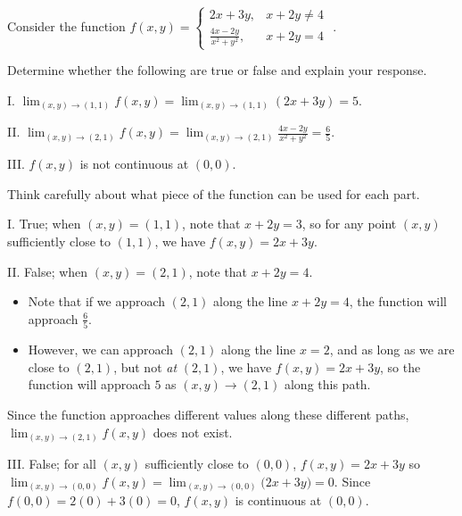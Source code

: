 \documentclass[noauthor, handout]{ximera}
\newcommand{\Lim}[2]{\lim_{#1 \to #2}}
\begin{document}

\begin{problem}
Consider the function $f(x,y) =  \begin{cases} 2x+3y , & x+2y \neq 4 \\[2 ex] \frac{4x-2y}{x^2+y^2} , & x+2y=4 \end{cases} $ . 

Determine whether the following are true or false and explain your response.

I. $\Lim{(x,y)}{(1,1)}f(x,y) = \Lim{(x,y)}{(1,1)} (2x+3y) = 5$.

II. $\Lim{(x,y)}{(2,1)}f(x,y) = \Lim{(x,y)}{(2,1)}  \frac{4x-2y}{x^2+y^2} = \frac{6}{5}$.

III. $f(x,y)$ is not continuous at $(0,0)$.

\begin{freeResponse}
Think carefully about what piece of the function can be used for each part.

I. True; when $(x,y)=(1,1)$, note that $x+2y=3$, so for any point $(x,y)$ sufficiently close to $(1,1)$, we have $f(x,y) = 2x+3y$.

II. False; when $(x,y)=(2,1)$, note that $x+2y=4$.  

\begin{itemize}
\item Note that if we approach $(2,1)$ along the line $x+2y=4$, the function will approach $\frac{6}{5}$.
\item However, we can approach $(2,1)$ along the line $x=2$, and as long as we are close to $(2,1)$, but not \emph{at} $(2,1)$, we have $f(x,y) = 2x+3y$, so the function will approach $5$ as $(x,y) \to (2,1)$ along this path.
\end{itemize}

Since the function approaches different values along these different paths, $\Lim{(x,y)}{(2,1)}f(x,y)$ does not exist.

III. False; for all $(x,y)$ sufficiently close to $(0,0)$, $f(x,y) = 2x+3y$ so $\Lim{(x,y)}{(0,0)}f(x,y) = \Lim{(x,y)}{(0,0)} \big(2x+3y\big) =0$.  Since $f(0,0) = 2(0)+3(0) = 0$, $f(x,y)$ is continuous at $(0,0)$.


\end{freeResponse}
\end{problem}
\end{document}
